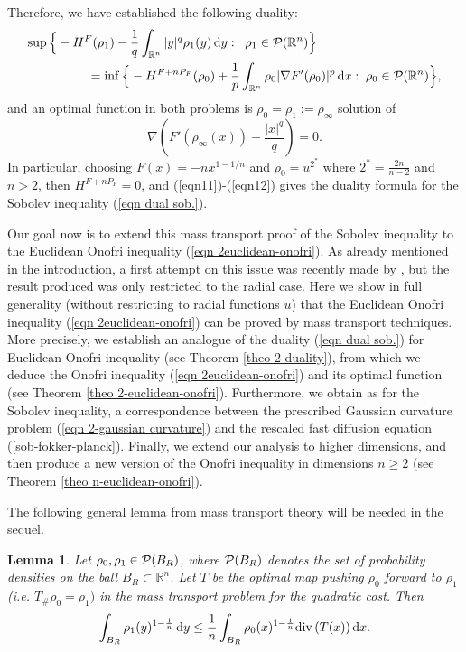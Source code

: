 \documentclass[10pt]{article}
\numberwithin{equation}{section}
\theoremstyle{plain}
\newtheorem{lem}[thm]{Lemma}
\theoremstyle{definition}
\theoremstyle{remark}
\newcommand\R{{\mathbb R}}
\newcommand\dd{\,\mbox{d} }
\def\P{{\cal P}}
\begin{document}
 Therefore, we have established the following duality:
 \begin{eqnarray}\label{eqn11}
\lefteqn{\sup\Big\{-H^F (\rho_1) - \frac{1}{q}\int_{\R^n} |y|^q\rho_1(y)\dd y: \;\;\rho_1\in{\cal P}(\R^n)\Big\} }\nonumber\\
& & \qquad \qquad  = \inf\Big\{ -H^{F+nP_F}(\rho_0) + \frac{1}{p} \int_{\R^n}\rho_0 |\nabla F'(\rho_0)|^p \,\mbox{d}x: \; \rho_0\in{\cal P}(\R^n)\Big\},
 \end{eqnarray}
and an optimal function in both problems is $\rho_0=\rho_1:=\rho_\infty$ solution of 
\begin{equation}\label{eqn12}
\nabla\left(F'\left(\rho_\infty(x)\right)+\frac{|x|^{q}}{q}\right)=0.
\end{equation}
In particular, choosing $F(x)=-nx^{1-1/n}$ and $\rho_0=u^{2^*}$ where $2^*=\frac{2n}{n-2}$ and $n>2$, then $H^{F+nP_F}=0$, and (\ref{eqn11})-(\ref{eqn12}) gives the duality formula for the Sobolev inequality (\ref{eqn dual sob.}).

\smallskip

Our goal now is to extend this mass transport proof of the Sobolev inequality to the Euclidean Onofri inequality (\ref{eqn 2euclidean-onofri}). As already mentioned in the introduction, a first attempt on this issue was recently made by \cite{DEJ}, but the result produced was only restricted to the radial case. Here we show in full generality (without restricting to radial functions $u$) that the Euclidean Onofri inequality (\ref{eqn 2euclidean-onofri}) can be proved by mass transport techniques. More precisely, we establish an analogue of the duality (\ref{eqn dual sob.}) for Euclidean Onofri inequality (see Theorem  \ref{theo 2-duality}), from which we deduce the Onofri inequality (\ref{eqn 2euclidean-onofri}) and its optimal function (see Theorem  \ref{theo 2-euclidean-onofri}). Furthermore, we obtain as for the Sobolev inequality, a correspondence between the prescribed Gaussian curvature problem (\ref{eqn 2-gaussian curvature}) and the rescaled fast diffusion equation (\ref{sob-fokker-planck}). Finally, we extend our analysis to higher dimensions, and then produce a new version of the Onofri inequality in dimensions $n\geq 2$ (see Theorem \ref{theo n-euclidean-onofri}).

\bigskip

The following general lemma from mass transport theory will be needed in the sequel.

\begin{lem}\label{lemma1}
 Let $\rho_0, \rho_1 \in \P(B_R)$, where $\P(B_R)$ denotes the set of probability densities on the ball $B_R\subset \R^n$. Let $T$ be the optimal map pushing $\rho_0$ forward to $\rho_1$ (i.e. $T_{\#}\rho_0=\rho_1)$  in the mass transport problem for the quadratic cost. Then 
\begin{equation}\label{eqn 2.1}
 \int_{B_R} \rho_1(y) ^{1-\frac{1}{n}}  \dd y \leq \frac{1}{n} \int_{B_R} \rho_0(x) ^ {1-\frac{1}{n}} {\rm div}\, (T(x)) \dd x .
\end{equation}
 \end{lem} 
\end{document}
